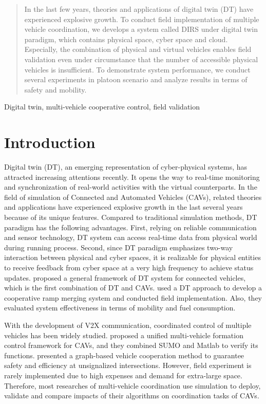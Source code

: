 \documentclass[conference]{IEEEtran}
\begin{document}
\begin{abstract}
	In the last few years, theories and applications of digital twin (DT) have experienced explosive growth. To conduct field implementation of multiple vehicle coordination, we develops a system called DIRS under digital twin paradigm, which contains physical space, cyber space and cloud. Especially, the combination of physical and virtual vehicles enables field validation even under circumstance that the number of accessible physical vehicles is insufficient. To demonstrate system performance, we conduct several experiments in platoon scenario and analyze results in terms of safety and mobility.
\end{abstract}

\begin{IEEEkeywords}
	Digital twin, multi-vehicle cooperative control, field validation 
\end{IEEEkeywords}
\section{Introduction}
	Digital twin (DT), an emerging representation of cyber-physical systems, has attracted increasing attentions recently. It opens the way to real-time monitoring and synchronization of real-world activities with the virtual counterparts\cite{ref:intro1}. In the field of simulation of Connected and Automated Vehicles (CAVs), related theories and applications have experienced explosive growth in the last several years because of its unique features. Compared to traditional simulation methods, DT paradigm has the following advantages. First, relying on reliable communication and sensor technology, DT system can access real-time data from physical world during running process. Second, since DT paradigm emphasizes two-way interaction between physical and cyber spaces, it is realizable for physical entities to receive feedback from cyber space at a very high frequency to achieve status updates. \cite{ref:intro1} proposed a general framework of DT system for connected vehicles, which is the first combination of DT and CAVs. \cite{ref:intro2} used a DT approach to develop a cooperative ramp merging system and conducted field implementation. Also, they evaluated system effectiveness in terms of mobility and fuel consumption.
	
	With the development of V2X communication, coordinated control of multiple vehicles has been widely studied. \cite{ref:lfq} proposed a unified multi-vehicle formation control framework for CAVs, and they combined SUMO and Matlab to verify its functions. \cite{ref:ccy} presented a graph-based vehicle cooperation method to guarantee safety and efficiency at unsignalized intersections. However, field experiment is rarely implemented due to high expenses and demand for extra-large space. Therefore, most researches of multi-vehicle coordination use simulation to deploy, validate and compare impacts of their algorithms on coordination tasks of CAVs. 
	
\end{document}
